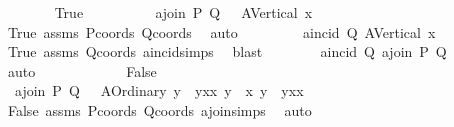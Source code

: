 \begin{isabellebody}
\ \ \ \ \ \ \isamarkupfalse%
\ True\ \isanewline
\ \ \ \ \ \ \isamarkupfalse%
\ {}{\isacharcolon}{\kern0pt}\ {\isachardoublequoteopen}a{}join\ P\ Q\ {\isacharequal}{\kern0pt}\ \ A{}Vertical\ x{}{\isachardoublequoteclose}\ \isamarkupfalse%
\ True\ assms\ Pcoords\ Qcoords\ \isamarkupfalse%
\ auto\isanewline
\ \ \ \ \ \ \isamarkupfalse%
\ {}{\isacharcolon}{\kern0pt}\ {\isachardoublequoteopen}a{}incid\ Q\ {\isacharparenleft}{\kern0pt}A{}Vertical\ x{}{\isacharparenright}{\kern0pt}{\isachardoublequoteclose}\ \isamarkupfalse%
\ True\ assms\ Qcoords\ a{}incid{\isachardot}{\kern0pt}simps\ \isamarkupfalse%
\ blast\isanewline
\ \ \ \ \ \ \isamarkupfalse%
\ {\isachardoublequoteopen}a{}incid\ Q\ {\isacharparenleft}{\kern0pt}a{}join\ P\ Q{\isacharparenright}{\kern0pt}{\isachardoublequoteclose}\ \isamarkupfalse%
\ {}\ {}\ \isamarkupfalse%
\ auto\isanewline
\ \ \ \ \isamarkupfalse%
\isanewline
\ \ \ \ \ \ \isamarkupfalse%
\ False\isanewline
\ \ \ \ \ \ \isamarkupfalse%
\ {}{\isacharcolon}{\kern0pt}\ {\isachardoublequoteopen}a{}join\ P\ Q\ {\isacharequal}{\kern0pt}\ \ {\isacharparenleft}{\kern0pt}A{}Ordinary\ {\isacharparenleft}{\kern0pt}{\isacharparenleft}{\kern0pt}y{}\ {\isacharminus}{\kern0pt}\ y{}{\isacharparenright}{\kern0pt}{\isacharslash}{\kern0pt}{\isacharparenleft}{\kern0pt}x{}{\isacharminus}{\kern0pt}x{}{\isacharparenright}{\kern0pt}{\isacharparenright}{\kern0pt}\ {\isacharparenleft}{\kern0pt}y{}\ {\isacharminus}{\kern0pt}\ x{}{\isacharasterisk}{\kern0pt}\ {\isacharparenleft}{\kern0pt}y{}\ {\isacharminus}{\kern0pt}\ y{}{\isacharparenright}{\kern0pt}{\isacharslash}{\kern0pt}{\isacharparenleft}{\kern0pt}x{}{\isacharminus}{\kern0pt}x{}{\isacharparenright}{\kern0pt}{\isacharparenright}{\kern0pt}{\isacharparenright}{\kern0pt}{\isachardoublequoteclose}\ \isamarkupfalse%
\ False\ assms\ Pcoords\ Qcoords\ a{}join{\isachardot}{\kern0pt}simps\ \isamarkupfalse%
\ auto\isanewline
\ \ \ \ \ \ \isamarkupfalse%

\end{isabellebody}
